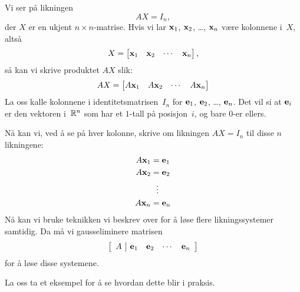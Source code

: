 Vi ser på likningen
\[
AX = I_n,
\]
der $X$ er en ukjent $n \times n$-matrise.  Hvis vi lar $\mathbf{x}_1$,
$\mathbf{x}_2$, \ldots, $\mathbf{x}_n$ være kolonnene i~$X$, altså
\[
X = \begin{bmatrix} \mathbf{x}_1 & \mathbf{x}_2 & \cdots & \mathbf{x}_n \end{bmatrix},
\]
så kan vi skrive produktet $AX$ slik:
\[
AX = \begin{bmatrix} A \mathbf{x}_1 & A \mathbf{x}_2 & \cdots & A \mathbf{x}_n \end{bmatrix}
\]
La oss kalle kolonnene i identitetsmatrisen~$I_n$ for $\mathbf{e}_1$,
$\mathbf{e}_2$, \ldots, $\mathbf{e}_n$.  Det vil si at $\mathbf{e}_i$ er den vektoren
i~$\mathbb{R}^n$ som har et $1$-tall på posisjon~$i$, og bare $0$-er ellers.

Nå kan vi, ved å se på hver kolonne, skrive om likningen $AX = I_n$
til disse $n$ likningene:
\begin{align*}
A \mathbf{x}_1 &= \mathbf{e}_1 \\
A \mathbf{x}_2 &= \mathbf{e}_2 \\
          &\ \ \vdots \\
A \mathbf{x}_n &= \mathbf{e}_n
\end{align*}
Nå kan vi bruke teknikken vi beskrev over for å løse flere
likningssystemer samtidig.  Da må vi gausseliminere matrisen
\[
\left[
\begin{array}{c|cccc} A & \mathbf{e}_1 & \mathbf{e}_2 & \cdots & \mathbf{e}_n \end{array}
\right]
\]
for å løse disse systemene.

La oss ta et eksempel for å se hvordan dette blir i praksis.

